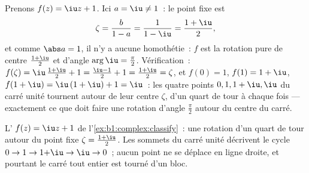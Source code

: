 \begin{example}\label{ex:b1:complex:classify}
Prenons $f(z) = \iu z + 1$. Ici $a = \iu \neq 1$~: le point fixe est
\[
\zeta = \frac{b}{1 - a} = \frac1{1 - \iu}
= \frac{1 + \iu}{2},
\]
et comme $\abs a = 1$, il n'y a aucune homothétie~: $f$ est la
rotation pure de centre $\frac{1+\iu}2$ et d'angle $\arg \iu =
\frac\pi2$. Vérification~: $f(\zeta) = \iu\,\frac{1+\iu}2 + 1 =
\frac{\iu - 1}2 + 1 = \frac{1 + \iu}2 = \zeta$, et $f(0) = 1$, $f(1) =
1 + \iu$, $f(1 + \iu) = \iu\,(1 + \iu) + 1 = \iu$~: les quatre points
$0, 1, 1+\iu, \iu$ du carré unité tournent autour de leur centre
$\zeta$, d'un quart de tour à chaque fois --- exactement ce que doit
faire une rotation d'angle $\frac\pi2$ autour du centre du carré.
\end{example}

\begin{omfigure}

{\small L' $f(z) = \iu z + 1$ de
l'\cref{ex:b1:complex:classify}~: une rotation d'un quart de tour
autour du point fixe $\zeta = \frac{1+\iu}2$. Les sommets du carré
unité décrivent le cycle $0 \to 1 \to 1{+}\iu \to \iu \to 0$~; aucun
point ne se déplace en ligne droite, et pourtant le carré tout
entier est tourné d'un bloc.}
\end{omfigure}

